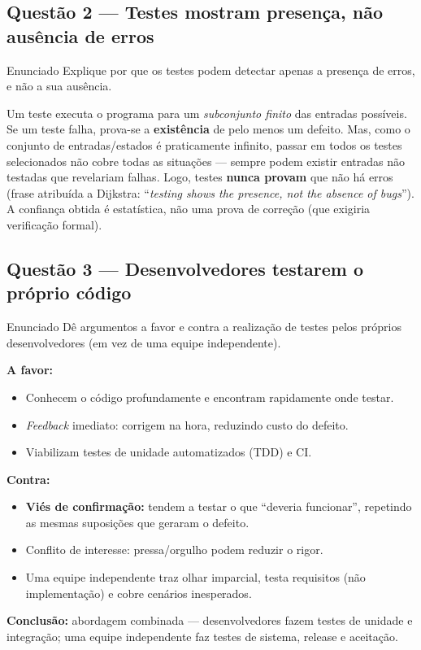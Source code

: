 \documentclass[11pt,a4paper]{article}
\begin{document}
\subsection*{Questão 2 — Testes mostram presença, não ausência de erros}
\begin{questao}{Enunciado}
Explique por que os testes podem detectar apenas a presença de erros, e não a
sua ausência.
\end{questao}
\begin{resposta}
Um teste executa o programa para um \emph{subconjunto finito} das entradas
possíveis. Se um teste falha, prova-se a \textbf{existência} de pelo menos um
defeito. Mas, como o conjunto de entradas/estados é praticamente infinito, passar
em todos os testes selecionados não cobre todas as situações — sempre podem
existir entradas não testadas que revelariam falhas. Logo, testes
\textbf{nunca provam} que não há erros (frase atribuída a Dijkstra: “\emph{testing
shows the presence, not the absence of bugs}”). A confiança obtida é estatística,
não uma prova de correção (que exigiria verificação formal).
\end{resposta}

\subsection*{Questão 3 — Desenvolvedores testarem o próprio código}
\begin{questao}{Enunciado}
Dê argumentos a favor e contra a realização de testes pelos próprios
desenvolvedores (em vez de uma equipe independente).
\end{questao}
\begin{resposta}
\textbf{A favor:}
\begin{itemize}[nosep]
  \item Conhecem o código profundamente e encontram rapidamente onde testar.
  \item \emph{Feedback} imediato: corrigem na hora, reduzindo custo do defeito.
  \item Viabilizam testes de unidade automatizados (TDD) e CI.
\end{itemize}
\textbf{Contra:}
\begin{itemize}[nosep]
  \item \textbf{Viés de confirmação:} tendem a testar o que “deveria funcionar”,
        repetindo as mesmas suposições que geraram o defeito.
  \item Conflito de interesse: pressa/orgulho podem reduzir o rigor.
  \item Uma equipe independente traz olhar imparcial, testa requisitos (não
        implementação) e cobre cenários inesperados.
\end{itemize}
\textbf{Conclusão:} abordagem combinada — desenvolvedores fazem testes de unidade
e integração; uma equipe independente faz testes de sistema, release e aceitação.
\end{resposta}
\end{document}
